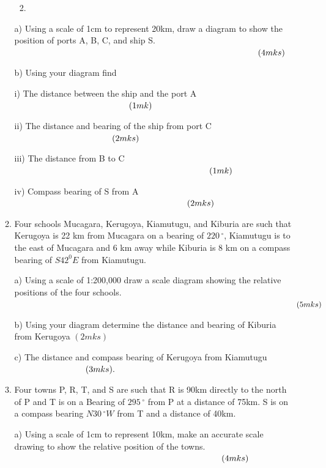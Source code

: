\documentclass[
  a4paperpaper,
]{scrbook}
\providecommand{\tightlist}{%
  \setlength{\itemsep}{0pt}\setlength{\parskip}{0pt}}\usepackage{longtable,booktabs,array}
\begin{document}
\begin{enumerate}
\begin{tcolorbox}
\begin{enumerate}
    \begin{enumerate}
    \def\labelenumiii{\Alph{enumiii}.}
    \setcounter{enumiii}{1}
    \tightlist
    \item
    \end{enumerate}

    a) Using a scale of 1cm to represent 20km, draw a diagram to show
    the position of ports A, B, C, and ship S.
    \(\hspace{10.0cm} (4mks)\)

    b) Using your diagram find

    i) The distance between the ship and the port A
    \(\hspace{4.7cm} (1mk)\)

    ii) The distance and bearing of the ship from port C
    \(\hspace{4.0cm} (2mks)\)

    iii) The distance from B to C \(\hspace{8.0cm} (1mk)\)

    iv) Compass bearing of S from A \(\hspace{7.1cm} (2mks)\)
  \item
    Four schools Mucagara, Kerugoya, Kiamutugu, and Kiburia are such
    that Kerugoya is 22 km from Mucagara on a bearing of
    \(220\,^{\circ}\), Kiamutugu is to the east of Mucagara and 6 km
    away while Kiburia is 8 km on a compass bearing of \(S42^0E\) from
    Kiamutugu.

    a) Using a scale of 1:200,000 draw a scale diagram showing the
    relative positions of the four schools. \(\hspace{12.5cm} (5mks)\)

    b) Using your diagram determine the distance and bearing of Kiburia
    from Kerugoya \(\hspace{0cm} (2mks)\)

    c) The distance and compass bearing of Kerugoya from Kiamutugu
    \(\hspace{2.9cm} (3mks).\)
  \item
    Four towns P, R, T, and S are such that R is 90km directly to the
    north of P and T is on a Bearing of \(295\,^{\circ}\) from P at a
    distance of 75km. S is on a compass bearing \(N30\,^{\circ}W\) from
    T and a distance of 40km.

    a) Using a scale of 1cm to represent 10km, make an accurate scale
    drawing to show the relative position of the towns.
    \(\hspace{8.5cm} (4mks)\)


\end{enumerate}
\end{tcolorbox}
\end{enumerate}
\end{document}
